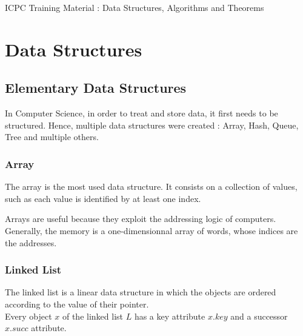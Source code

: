 \documentclass[10pt,landscape,twocolumn]{article}
\begin{document}
\begin{center}
	\Large ICPC Training Material : Data Structures, Algorithms and Theorems 
\end{center}

\tableofcontents

\section{Data Structures}

\subsection{Elementary Data Structures}
In Computer Science, in order to treat and store data, it first needs to be structured. Hence, multiple data structures were created : Array, Hash, Queue, Tree and multiple others.

\subsubsection{Array}
The array is the most used data structure. It consists on a collection of values, such as each value is identified by at least one index. 

\begin{center}
\end{center}
Arrays are useful because they exploit the addressing logic of computers. Generally, the memory is a one-dimensionnal array of words, whose indices are the addresses. 


\subsubsection{Linked List}

The linked list is a linear data structure in which the objects are ordered according to the value of their pointer. \\

Every object $x$ of the linked list $L$ has a key attribute $x.key$ and a successor $x.succ$ attribute.
\end{document}
